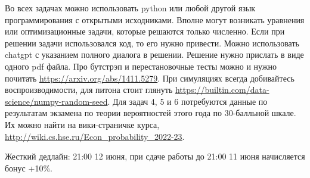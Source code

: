 \documentclass[12pt]{article} %
\begin{document}
Во всех задачах можно использовать python или любой другой язык программирования с открытыми исходниками. 
Вполне могут возникать уравнения или оптимизационные задачи, которые решаются только численно.
Если при решении задачи использовался код, то его нужно привести. 
Можно использовать chatgpt с указанием полного диалога в решении.  
Решение нужно прислать в виде одного pdf файла. 
Про бутстрэп и перестановочные тесты можно и нужно почитать \url{https://arxiv.org/abs/1411.5279}.
При симуляциях всегда добивайтесь воспроизводимости, для питона стоит глянуть \url{https://builtin.com/data-science/numpy-random-seed}.
Для задач 4, 5 и 6 потребуются данные по результатам экзамена по теории вероятностей этого года 
по 30-балльной шкале. Их можно найти на вики-страничке курса, \url{http://wiki.cs.hse.ru/Econ_probability_2022-23}. 

Жесткий дедлайн: 21:00 12 июня, 
при сдаче работы до 21:00 11 июня начисляется бонус +10\%.  
\end{document}
